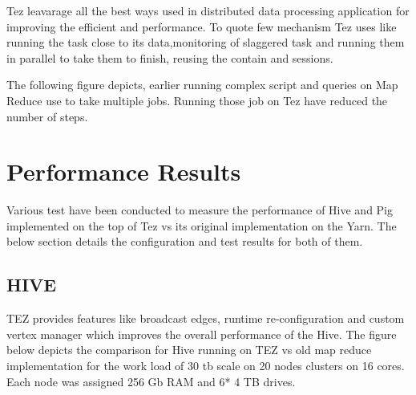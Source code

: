 \documentclass[9pt,twocolumn,twoside]{../../styles/osajnl}
\begin{document}
 Tez leavarage all the best ways used in distributed data processing 
 application for improving the efficient and performance. To quote few mechanism Tez uses
 like running the task close to its data,monitoring of slaggered task and running them in parallel
 to take them to finish, reusing the contain and sessions. 

 The following figure depicts, earlier running complex script and queries on Map Reduce use to take multiple jobs. 
 Running those job on Tez have reduced the number of steps. 
    

 \begin{figure}[htbp]
 \centering
 \caption{\cite{www-tez.org}}
 \label{Reference:false-color}
 \end{figure}

 
 \section{Performance Results}

 Various test have been conducted to measure the performance of Hive and Pig implemented on the top of Tez vs its original    implementation on the Yarn. The below section details the configuration and test results for both of them.
 
 \subsection{HIVE}
 
 TEZ provides features like broadcast edges, runtime re-configuration and custom vertex manager which improves the overall 
 performance  of the Hive. The figure below depicts the comparison for Hive running on TEZ vs old map reduce implementation
 for the work load of 30 tb scale on 20 nodes clusters on 16 cores. Each node was assigned 256 Gb RAM and 6* 4 TB drives.
\end{document}
